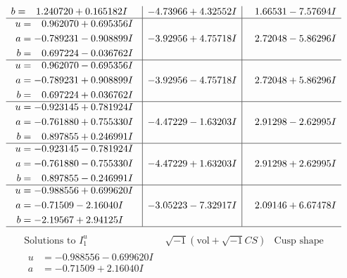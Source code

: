 \documentclass[1p]{elsarticle_modified}
\theoremstyle{definition}
\newcommand{\I}{\sqrt{-1}}
\begin{document}
$$\begin{array}{c|c|c}
\begin{aligned}
b &= \phantom{-}1.240720 + 0.165182 I\end{aligned}
 & -4.73966 + 4.32552 I & \phantom{-}1.66531 - 7.57694 I \\ \hline\begin{aligned}
u &= \phantom{-}0.962070 + 0.695356 I \\
a &= -0.789231 - 0.908899 I \\
b &= \phantom{-}0.697224 - 0.036762 I\end{aligned}
 & -3.92956 + 4.75718 I & \phantom{-}2.72048 - 5.86296 I \\ \hline\begin{aligned}
u &= \phantom{-}0.962070 - 0.695356 I \\
a &= -0.789231 + 0.908899 I \\
b &= \phantom{-}0.697224 + 0.036762 I\end{aligned}
 & -3.92956 - 4.75718 I & \phantom{-}2.72048 + 5.86296 I \\ \hline\begin{aligned}
u &= -0.923145 + 0.781924 I \\
a &= -0.761880 + 0.755330 I \\
b &= \phantom{-}0.897855 + 0.246991 I\end{aligned}
 & -4.47229 - 1.63203 I & \phantom{-}2.91298 - 2.62995 I \\ \hline\begin{aligned}
u &= -0.923145 - 0.781924 I \\
a &= -0.761880 - 0.755330 I \\
b &= \phantom{-}0.897855 - 0.246991 I\end{aligned}
 & -4.47229 + 1.63203 I & \phantom{-}2.91298 + 2.62995 I \\ \hline\begin{aligned}
u &= -0.988556 + 0.699620 I \\
a &= -0.71509 - 2.16040 I \\
b &= -2.19567 + 2.94125 I\end{aligned}
 & -3.05223 - 7.32917 I & \phantom{-}2.09146 + 6.67478 I\\
 \hline 
 \end{array}$$\newpage$$\begin{array}{c|c|c}  
\text{Solutions to }I^u_{1}& \I (\text{vol} + \sqrt{-1}CS) & \text{Cusp shape}\\
 \hline 
\begin{aligned}
u &= -0.988556 - 0.699620 I \\
a &= -0.71509 + 2.16040 I \\

\end{aligned}
\end{array}$$
\end{document}
